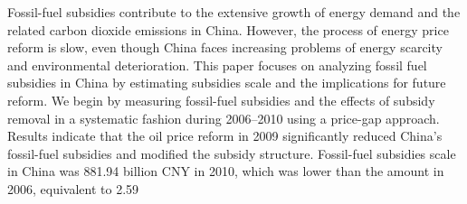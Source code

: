 Fossil-fuel subsidies contribute to the extensive growth of energy demand and the related carbon dioxide emissions in China. However, the process of energy price reform is slow, even though China faces increasing problems of energy scarcity and environmental deterioration. This paper focuses on analyzing fossil fuel subsidies in China by estimating subsidies scale and the implications for future reform. We begin by measuring fossil-fuel subsidies and the effects of subsidy removal in a systematic fashion during 2006–2010 using a price-gap approach. Results indicate that the oil price reform in 2009 significantly reduced China’s fossil-fuel subsidies and modified the subsidy structure. Fossil-fuel subsidies scale in China was 881.94 billion CNY in 2010, which was lower than the amount in 2006, equivalent to 2.59%